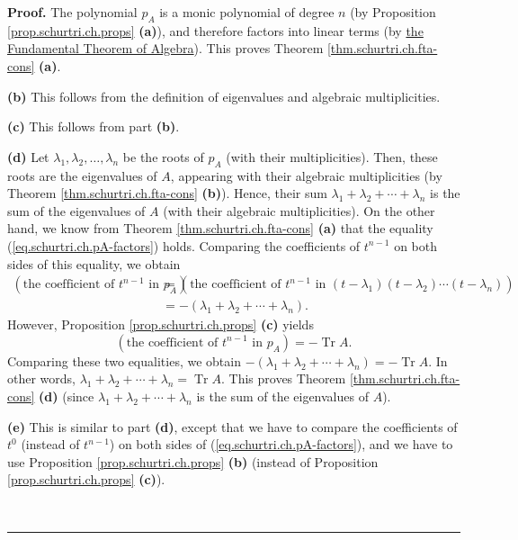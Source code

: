 \documentclass[numbers=enddot,12pt,final,onecolumn,notitlepage]{scrartcl}%
\numberwithin{exer}{subsection}
\theoremstyle{definition}
\newenvironment{proof}[1][Proof]{\noindent\textbf{#1.} }{\ \rule{0.5em}{0.5em}}
\begin{document}
\begin{proof}
The polynomial $p_{A}$ is a monic polynomial of degree $n$ (by Proposition
\ref{prop.schurtri.ch.props} \textbf{(a)}), and therefore factors into linear
terms (by
\href{https://en.wikipedia.org/wiki/Fundamental_theorem_of_algebra}{the
Fundamental Theorem of Algebra}). This proves Theorem
\ref{thm.schurtri.ch.fta-cons} \textbf{(a)}. \medskip

\textbf{(b)} This follows from the definition of eigenvalues and algebraic
multiplicities. \medskip

\textbf{(c)} This follows from part \textbf{(b)}. \medskip

\textbf{(d)} Let $\lambda_{1},\lambda_{2},\ldots,\lambda_{n}$ be the roots of
$p_{A}$ (with their multiplicities). Then, these roots are the eigenvalues of
$A$, appearing with their algebraic multiplicities (by Theorem
\ref{thm.schurtri.ch.fta-cons} \textbf{(b)}). Hence, their sum $\lambda
_{1}+\lambda_{2}+\cdots+\lambda_{n}$ is the sum of the eigenvalues of $A$
(with their algebraic multiplicities). On the other hand, we know from Theorem
\ref{thm.schurtri.ch.fta-cons} \textbf{(a)} that the equality
(\ref{eq.schurtri.ch.pA-factors}) holds. Comparing the coefficients of
$t^{n-1}$ on both sides of this equality, we obtain%
\begin{align*}
\left(  \text{the coefficient of }t^{n-1}\text{ in }p_{A}\right)   &  =\left(
\text{the coefficient of }t^{n-1}\text{ in }\left(  t-\lambda_{1}\right)
\left(  t-\lambda_{2}\right)  \cdots\left(  t-\lambda_{n}\right)  \right) \\
&  =-\left(  \lambda_{1}+\lambda_{2}+\cdots+\lambda_{n}\right)  .
\end{align*}
However, Proposition \ref{prop.schurtri.ch.props} \textbf{(c)} yields
\[
\left(  \text{the coefficient of }t^{n-1}\text{ in }p_{A}\right)
=-\operatorname*{Tr}A.
\]
Comparing these two equalities, we obtain $-\left(  \lambda_{1}+\lambda
_{2}+\cdots+\lambda_{n}\right)  =-\operatorname*{Tr}A$. In other words,
$\lambda_{1}+\lambda_{2}+\cdots+\lambda_{n}=\operatorname*{Tr}A$. This proves
Theorem \ref{thm.schurtri.ch.fta-cons} \textbf{(d)} (since $\lambda
_{1}+\lambda_{2}+\cdots+\lambda_{n}$ is the sum of the eigenvalues of $A$).
\medskip

\textbf{(e)} This is similar to part \textbf{(d)}, except that we have to
compare the coefficients of $t^{0}$ (instead of $t^{n-1}$) on both sides of
(\ref{eq.schurtri.ch.pA-factors}), and we have to use Proposition
\ref{prop.schurtri.ch.props} \textbf{(b)} (instead of Proposition
\ref{prop.schurtri.ch.props} \textbf{(c)}).\medskip


\end{proof}
\end{document}
